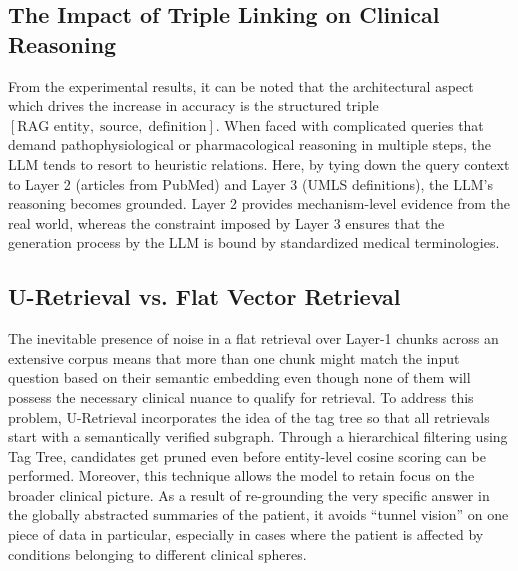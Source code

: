 \documentclass[a4paper,fleqn]{cas-sc}
\begin{document}
\subsection{The Impact of Triple Linking on Clinical Reasoning}
From the experimental results, it can be noted that the architectural aspect which drives the increase in accuracy is the structured triple $[\text{RAG entity},\; \text{source},\; \text{definition}]$. When faced with complicated queries that demand pathophysiological or pharmacological reasoning in multiple steps, the LLM tends to resort to heuristic relations. Here, by tying down the query context to Layer 2 (articles from PubMed) and Layer 3 (UMLS definitions), the LLM's reasoning becomes grounded. Layer 2 provides mechanism-level evidence from the real world, whereas the constraint imposed by Layer 3 ensures that the generation process by the LLM is bound by standardized medical terminologies.

\subsection{U-Retrieval vs. Flat Vector Retrieval}
The inevitable presence of noise in a flat retrieval over Layer-1 chunks across an extensive corpus means that more than one chunk might match the input question based on their semantic embedding even though none of them will possess the necessary clinical nuance to qualify for retrieval. To address this problem, U-Retrieval incorporates the idea of the tag tree so that all retrievals start with a semantically verified subgraph. Through a hierarchical filtering using Tag Tree, candidates get pruned even before entity-level cosine scoring can be performed. Moreover, this technique allows the model to retain focus on the broader clinical picture. As a result of re-grounding the very specific answer in the globally abstracted summaries of the patient, it avoids ``tunnel vision'' on one piece of data in particular, especially in cases where the patient is affected by conditions belonging to different clinical spheres.
\end{document}
